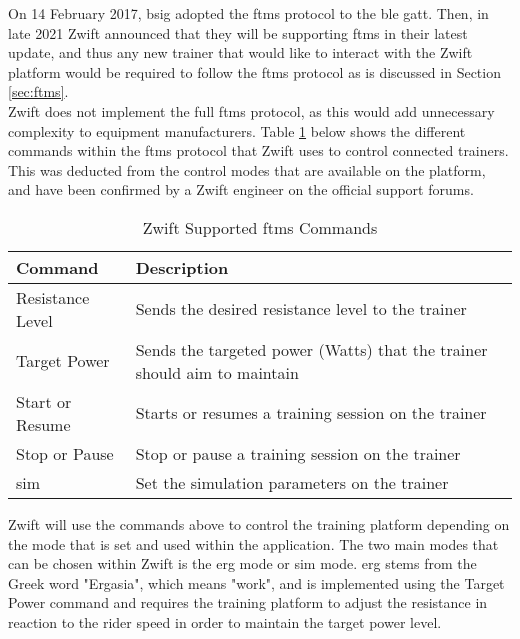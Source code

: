 On 14 February 2017, \ac{bsig} adopted the \ac{ftms} protocol to the \ac{ble} \ac{gatt}. Then, in late 2021 Zwift announced that they will be supporting \ac{ftms} in their latest update, and thus any new trainer that would like to interact with the Zwift platform would be required to follow the \ac{ftms} protocol as is discussed in Section \ref{sec:ftms}. \citep{Jeremy:2021}\\

Zwift does not implement the full \ac{ftms} protocol, as this would add unnecessary complexity to equipment manufacturers. Table \ref{tab:blreq} below shows the different commands within the \ac{ftms} protocol that Zwift uses to control connected trainers. This was deducted from the control modes that are available on the platform, and have been confirmed by a Zwift engineer on the official support forums. \citep{Jeremy:2021}

\begin{table}[H]
	\renewcommand{\arraystretch}{\tablestretch}
	\centering
	\caption{Zwift Supported \ac{ftms} Commands}
	\begin{tabularx}{\textwidth}{ >{\raggedright}p{4cm} X}
		\toprule
		Command          & Description                                                              \\
		\midrule
		Resistance Level & Sends the desired resistance level to the trainer                        \\
		Target Power     & Sends the targeted power (Watts) that the trainer should aim to maintain \\
		Start or Resume  & Starts or resumes a training session on the trainer                      \\
		Stop or Pause    & Stop or pause a training session on the trainer                          \\
		\ac{sim}         & Set the simulation parameters on the trainer                             \\
		\bottomrule
	\end{tabularx}
	\label{tab:blreq}
\end{table}

Zwift will use the commands above to control the training platform depending on the mode that is set and used within the application. The two main modes that can be chosen within Zwift is the \acf{erg} mode or \acf{sim} mode. \ac{erg} stems from the Greek word "Ergasia", which means "work", and is implemented using the Target Power command and requires the training platform to adjust the resistance in reaction to the rider speed in order to maintain the target power level. \citep{Zwiftinsider:2022}

